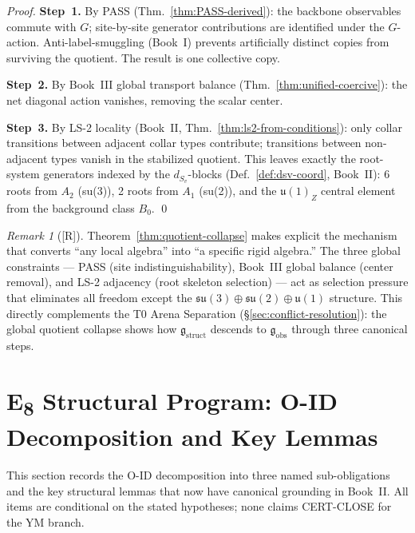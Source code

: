 \documentclass[12pt,oneside]{amsbook}
\theoremstyle{plain}
\theoremstyle{definition}
\theoremstyle{remark}
\newtheorem{remark}[theorem]{Remark}
\newcommand{\status}[1]{\textup{[#1]}}
\begin{document}
\begin{proof}
\textbf{Step~1.} By PASS (Thm.~\ref{thm:PASS-derived}): the backbone
observables commute with $G$; site-by-site generator contributions
are identified under the $G$-action. Anti-label-smuggling
(Book~I) prevents artificially distinct copies from surviving
the quotient. The result is one collective copy.

\textbf{Step~2.} By Book~III global transport balance
(Thm.~\ref{thm:unified-coercive}): the net diagonal action vanishes, removing
the scalar center.

\textbf{Step~3.} By LS-2 locality (Book~II,
Thm.~\ref{thm:ls2-from-conditions}): only collar transitions
between adjacent collar types contribute; transitions between
non-adjacent types vanish in the stabilized quotient. This leaves
exactly the root-system generators indexed by the $d_{S_v}$-blocks
(Def.~\ref{def:dsv-coord}, Book~II): 6 roots from $A_2$ (su(3)),
2 roots from $A_1$ (su(2)), and the $\mathfrak{u}(1)_Z$ central
element from the background class $B_0$. \qed
\end{proof}

\begin{remark}[\status{R}]
Theorem~\ref{thm:quotient-collapse} makes explicit the mechanism
that converts ``any local algebra'' into ``a specific rigid
algebra.'' The three global constraints --- PASS (site
indistinguishability), Book~III global balance (center removal),
and LS-2 adjacency (root skeleton selection) --- act as
selection pressure that eliminates all freedom except the
$\mathfrak{su}(3)\oplus\mathfrak{su}(2)\oplus\mathfrak{u}(1)$
structure. This directly complements the T0 Arena Separation
(§\ref{sec:conflict-resolution}): the global quotient collapse
shows how $\mathfrak{g}_{\mathrm{struct}}$ descends to
$\mathfrak{g}_{\mathrm{obs}}$ through three canonical steps.
\end{remark}

\section{E\textsubscript{8} Structural Program: O-ID Decomposition and Key Lemmas}
\label{sec:E8-program}

This section records the O-ID decomposition into three named
sub-obligations and the key structural lemmas that now have canonical
grounding in Book~II. All items are conditional on the stated
hypotheses; none claims CERT-CLOSE for the YM branch.
\end{document}
